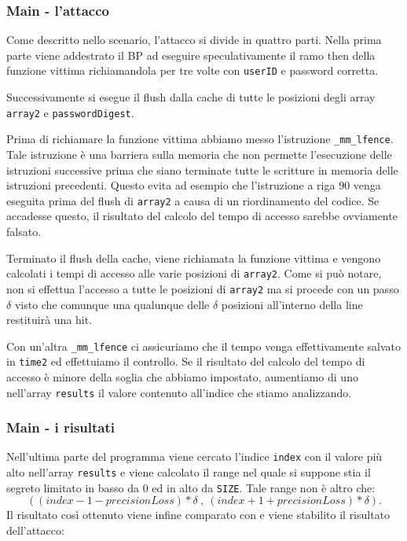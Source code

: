 				\subsubsection{Main - l'attacco}
				
				Come descritto nello scenario, l'attacco si divide in quattro parti. Nella prima parte viene addestrato il \ac{BP} ad eseguire speculativamente il ramo then della funzione vittima richiamandola per tre volte con \texttt{userID} e password corretta.
				
				Successivamente si esegue il flush dalla cache di tutte le posizioni degli array \texttt{array2} e \texttt{passwordDigest}.
				
				Prima di richiamare la funzione vittima abbiamo messo l'istruzione \texttt{\_mm\_lfence}. Tale istruzione è una barriera sulla memoria che non permette l'esecuzione delle istruzioni successive prima che siano terminate tutte le scritture in memoria delle istruzioni precedenti. Questo evita ad esempio che l'istruzione a riga $90$ venga eseguita prima del flush di \texttt{array2} a causa di un riordinamento del codice. Se accadesse questo, il risultato del calcolo del tempo di accesso sarebbe ovviamente falsato.
				
				Terminato il flush della cache, viene richiamata la funzione vittima e vengono calcolati i tempi di accesso alle varie posizioni di \texttt{array2}. Come si può notare, non si effettua l'accesso a tutte le posizioni di \texttt{array2} ma si procede con un passo $\delta$ visto che comunque una qualunque delle $\delta$ posizioni all'interno della line restituirà una hit.
				
				Con un'altra \texttt{\_mm\_lfence} ci assicuriamo che il tempo venga effettivamente salvato in \texttt{time2} ed effettuiamo il controllo. Se il risultato del calcolo del tempo di accesso è minore della soglia che abbiamo impostato, aumentiamo di uno nell'array \texttt{results} il valore  contenuto all'indice che stiamo analizzando.
				
				\subsubsection{Main - i risultati}
				
				Nell'ultima parte del programma viene cercato l'indice \texttt{index} con il valore più alto nell'array \texttt{results} e viene calcolato il range nel quale si suppone stia il segreto limitato in basso da $0$ ed in alto da \texttt{SIZE}. Tale range non è altro che: $$((index - 1 - precisionLoss) * \delta\ ,\ (index + 1 + precisionLoss) * \delta).$$ Il risultato così ottenuto viene infine comparato con  e viene stabilito il risultato dell'attacco:
				
